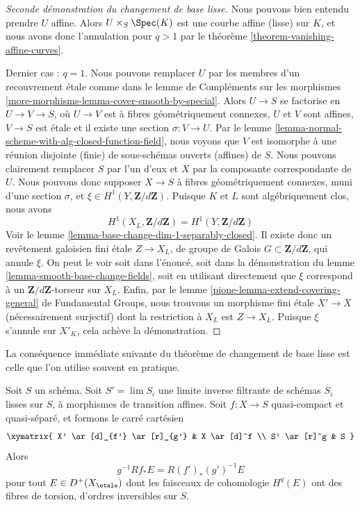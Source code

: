\begin{proof}[Seconde démonstration du changement de base lisse]
\medskip\noindent
Nous pouvons bien entendu prendre $U$ affine. Alors $U \times_S \Spec(K)$
est une courbe affine (lisse) sur $K$, et nous avons donc l'annulation
pour $q > 1$ par le théorème \ref{theorem-vanishing-affine-curves}.

\medskip\noindent
Dernier cas : $q = 1$. Nous pouvons remplacer $U$ par les membres d'un
recouvrement étale comme dans le lemme de Compléments sur les morphismes
\ref{more-morphisms-lemma-cover-smooth-by-special}.
Alors $U \to S$ se factorise en $U \to V \to S$, où
$U \to V$ est à fibres géométriquement connexes,
$U$ et $V$ sont affines, $V \to S$ est étale et il existe
une section $\sigma : V \to U$. Par le
lemme \ref{lemma-normal-scheme-with-alg-closed-function-field},
nous voyons que $V$ est isomorphe à une réunion disjointe (finie) de
sous-schémas ouverts (affines) de $S$.
Nous pouvons clairement remplacer $S$ par l'un d'eux
et $X$ par la composante correspondante de $U$.
Nous pouvons donc supposer $X \to S$ à fibres géométriquement connexes,
muni d'une section $\sigma$, et
$\xi \in H^1(Y, \mathbf{Z}/d\mathbf{Z})$.
Puisque $K$ et $L$ sont algébriquement clos, nous avons
$$
H^1(X_L, \mathbf{Z}/d\mathbf{Z}) =
H^1(Y, \mathbf{Z}/d\mathbf{Z})
$$
Voir le lemme \ref{lemma-base-change-dim-1-separably-closed}.
Il existe donc un revêtement galoisien fini étale
$Z \to X_L$, de groupe de Galois $G \subset \mathbf{Z}/d\mathbf{Z}$,
qui annule $\xi$.
On peut le voir soit dans l'énoncé, soit dans la
démonstration du lemme \ref{lemma-smooth-base-change-fields},
soit en utilisant directement que $\xi$ correspond à un
$\mathbf{Z}/d\mathbf{Z}$-torseur sur $X_L$.
Enfin, par le
lemme \ref{pione-lemma-extend-covering-general} de Fundamental Groups,
nous trouvons un morphisme fini étale
$X' \to X$ (nécessairement surjectif)
dont la restriction à $X_L$ est $Z \to X_L$.
Puisque $\xi$ s'annule sur $X'_K$, cela achève la démonstration.
\end{proof}

\noindent
La conséquence immédiate suivante du théorème de changement de base
lisse est celle que l'on utilise souvent en pratique.

\begin{lemma}
\label{lemma-smooth-base-change-general}
Soit $S$ un schéma. Soit $S' = \lim S_i$ une limite inverse
filtrante de schémas $S_i$ lisses sur $S$, à morphismes de transition
affines. Soit $f : X \to S$ quasi-compact et quasi-séparé,
et formons le carré cartésien
$$
\xymatrix{
X' \ar[d]_{f'} \ar[r]_{g'} & X \ar[d]^f \\
S' \ar[r]^g & S
}
$$
Alors
$$
g^{-1}Rf_*E = R(f')_*(g')^{-1}E
$$
pour tout $E \in D^+(X_\etale)$ dont les faisceaux de cohomologie $H^q(E)$
ont des fibres de torsion, d'ordres inversibles sur $S$.
\end{lemma}

